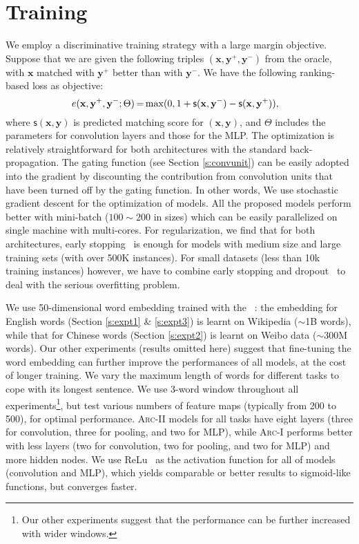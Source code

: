 \documentclass{article} \usepackage{nips14submit_e,times}
\newcommand{\x}{\ensuremath{\mathbf{x}}}
\newcommand{\y}{\ensuremath{\mathbf{y}}}
\newcommand{\0}{\ensuremath{\mathbf{0}}}
\newcommand{\1}{\ensuremath{\mathbf{1}}}
\begin{document}
\section{Training}  \label{s:opt} \vspace{-10pt}

We employ a discriminative training strategy with a large margin objective. Suppose that we are given the following triples $(\x, \y^+, \y^-)$ from the oracle, with $\x$ matched with $\y^+$ better than with $\y^-$.  We have the following ranking-based loss as objective:
{\small
\[
e(\x, \y^+, \y^-; \Theta)\hspace{-1pt} = \hspace{-1pt}
\max(0, 1+\textsf{s}(\x,\y^-)-\textsf{s}(\x,\y^+)), \;\;\;\]}
where $\textsf{s}(\x,\y)$ is predicted matching score for $(\x,\y)$, and $\Theta$ includes the parameters for convolution layers and those for the MLP. The optimization is relatively straightforward for both architectures with the standard back-propagation. The gating function (see Section \ref{s:convunit}) can be easily adopted into the gradient by discounting the contribution from convolution units that have been turned off by the gating function. In other words,
We use stochastic gradient descent for the optimization of models.  All the proposed models perform better with mini-batch ($100\sim200$ in sizes) which can be easily parallelized on single machine with multi-cores.
For regularization, we find that for both architectures, early stopping~\cite{earlystoping} is enough for models with medium size and large training sets (with over 500K instances). For small datasets (less than 10k training instances) however, we have to combine early stopping and dropout~\cite{dropout} to deal with the serious overfitting problem. \hspace{-10pt}

We use 50-dimensional word embedding trained with the ~\cite{word2vec}: the embedding for English words (Section \ref{s:expt1} \& \ref{s:expt3}) is learnt on Wikipedia ($\sim$1B words), while that for Chinese words (Section \ref{s:expt2}) is learnt on Weibo data ($\sim$300M words). Our other experiments (results omitted here) suggest that fine-tuning the word embedding can further improve the performances of all models, at the cost of longer training. We vary the maximum length of words for different tasks to cope with its longest sentence. We use 3-word window throughout all experiments\footnote{Our other experiments suggest that the performance can be further increased with wider windows.}, but test various numbers of feature maps (typically from 200 to 500), for optimal performance. \textsc{Arc-II} models for all tasks have eight layers (three for convolution, three for pooling, and two for MLP), while \textsc{Arc-I} performs better with less layers (two for convolution, two for pooling, and two for MLP) and more hidden nodes.  We use ReLu~\cite{relu} as the activation function for all of models (convolution and MLP), which yields comparable or better results to sigmoid-like functions, but converges faster. \vspace{-10pt}
\end{document}

